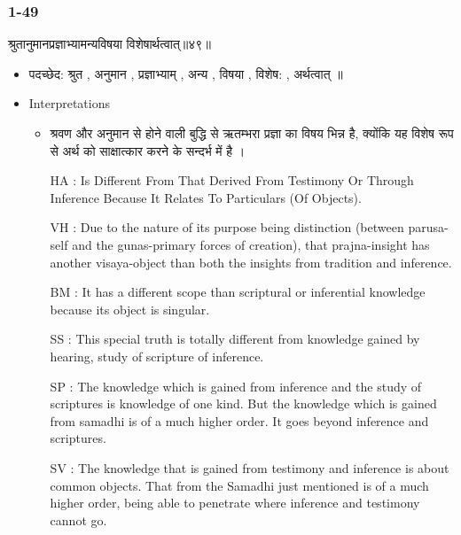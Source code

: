 \begin{frame}[fragile]\frametitle{ 1-49}
\begin{sanskrit}
श्रुतानुमानप्रज्ञाभ्यामन्यविषया विशेषार्थत्वात्॥४९॥
\end{sanskrit}

	\begin{itemize}
	\item पदच्छेद: श्रुत , अनुमान , प्रज्ञाभ्याम् , अन्य , विषया , विशेष: , अर्थत्वात् ॥
	\item Interpretations
		\begin{itemize}
		\item श्रवण और अनुमान से होने वाली बुद्धि से ऋतम्भरा प्रज्ञा का विषय भिन्न है, क्योंकि यह विशेष रूप से अर्थ को साक्षात्कार करने के सन्दर्भ में है ।
		\item [HA]: Is Different From That Derived From Testimony Or Through Inference Because It Relates To Particulars (Of Objects).
		\item [VH]: Due to the nature of its purpose being distinction (between parusa-self and the gunas-primary forces of creation), that prajna-insight has another visaya-object than both the insights from tradition and inference.
		\item [BM]: It has a different scope than scriptural or inferential knowledge because its object is singular.
		\item [SS]: This special truth is totally different from knowledge gained by hearing, study of scripture of inference.
		\item [SP]: The knowledge which is gained from inference and the study of scriptures is knowledge of one kind. But the knowledge which is gained from samadhi is of a much higher order. It goes beyond inference and scriptures.
		\item [SV]: The knowledge that is gained from testimony and inference is about common objects. That from the Samadhi just mentioned is of a much higher order, being able to penetrate where inference and testimony cannot go. 
		\end{itemize}
	\end{itemize}
	
\end{frame}


